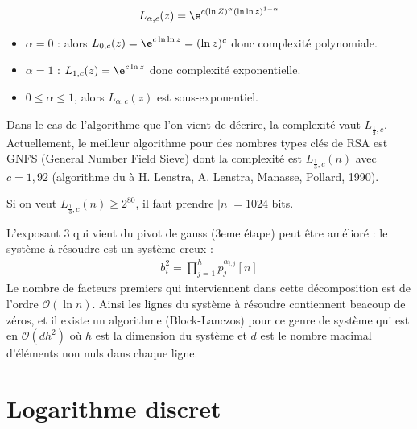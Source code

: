                 \begin{nota}
                    \begin{align*}
                        L_{\alpha, c}(z) = \e^{c (\ln Z)^\alpha (\ln \ln z)^{1 - \alpha}}
                    \end{align*}
                    \begin{itemize}
                        \item $\alpha = 0$ : alors $L_{0, c}(z) = \e^{c \ln \ln z} = (\ln z)^c$ donc complexité polynomiale.
                        \item $\alpha = 1$ : $L_{1, c}(z) = \e^{c \ln z}$ donc complexité exponentielle.
                        \item $0 \leq \alpha \leq 1$, alors $L_{\alpha, c}(z)$ est sous-exponentiel.
                    \end{itemize}
                \end{nota}
                Dans le cas de l'algorithme que l'on vient de décrire, la complexité vaut $L_{\frac 12, c}$. Actuellement, le meilleur algorithme pour des nombres types clés de RSA est GNFS (General Number Field Sieve) dont la complexité est $L_{\frac13, c}(n)$ avec $c = 1,92$ (algorithme du à H. Lenstra, A. Lenstra, Manasse, Pollard, 1990).
                \begin{remq}
                    Si on veut $L_{\frac13, c}(n) \geq 2^{80}$, il faut prendre $|n| = 1024$ bits.
                \end{remq}
                \begin{remq}
                    L'exposant $3$ qui vient du pivot de gauss (3eme étape) peut être amélioré : le système à résoudre est un système creux :
                    \begin{align*}
                        b_i^2 = \prod_{j = 1}^h p_j^{\alpha_{i, j}} [n]
                    \end{align*}
                    Le nombre de facteurs premiers qui interviennent dans cette décomposition est de l'ordre $\mathcal{O}(\ln n)$. Ainsi les lignes du système à résoudre contiennent beacoup de zéros, et il existe un algorithme (Block-Lanczos) pour ce genre de système qui est en $\mathcal{O}(dh^2)$ où $h$ est la dimension du système et $d$ est le nombre macimal d'éléments non nuls dans chaque ligne.
                \end{remq}

    \section{Logarithme discret}
